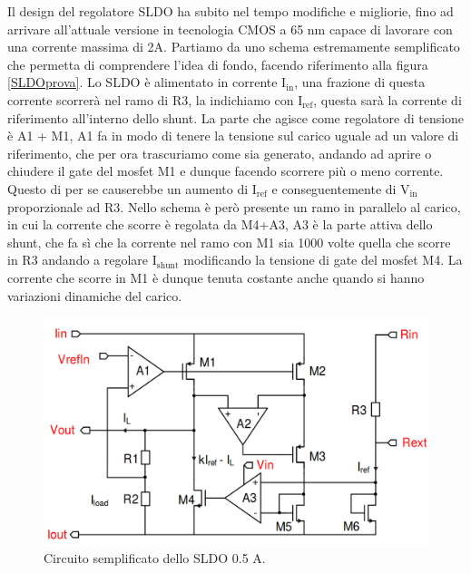 Il design del regolatore SLDO ha subito nel tempo modifiche e migliorie, fino ad arrivare all'attuale versione in tecnologia CMOS a 65 nm capace di lavorare con una corrente massima di 2A.
Partiamo da uno schema estremamente semplificato che permetta di comprendere l'idea di fondo, facendo riferimento alla figura \ref{SLDOprova}. 
Lo SLDO è alimentato in corrente $\mathrm{I_{in}}$, una frazione di questa corrente scorrerà nel ramo di R3, la indichiamo con $\mathrm{I_{ref}}$, questa sarà la corrente di riferimento all'interno dello shunt. 
La parte che agisce come regolatore di tensione è A1 + M1, A1 fa in modo di tenere la tensione sul carico uguale ad un valore di riferimento, che per ora trascuriamo come sia generato, andando ad aprire o chiudere il gate del mosfet M1 e dunque facendo scorrere più o meno corrente. 
Questo di per se causerebbe un aumento di $\mathrm{I_{ref}}$ e conseguentemente di $\mathrm{V_{in}}$ proporzionale ad R3. Nello schema è però presente un ramo in parallelo al carico, in cui la corrente che scorre è regolata da M4+A3, A3 è la parte attiva dello shunt, che fa sì che la corrente nel ramo con M1 sia 1000 volte quella che scorre in R3 andando a regolare $\mathrm{I_{shunt}}$ modificando la tensione di gate del mosfet M4. 
La corrente che scorre in M1 è dunque tenuta costante anche quando si hanno variazioni dinamiche del carico.

\begin{figure}
\centering
\includegraphics[scale=.3]{Immagini/SLDO5A}
\caption{Circuito semplificato dello SLDO 0.5 A.}
\label{SLDO5A}
\end{figure}

